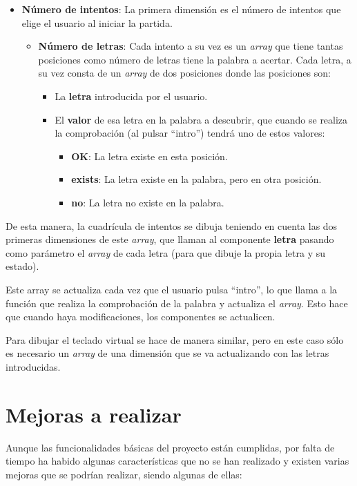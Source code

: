 \documentclass{\ClassPath/viu-tfm-template}
\begin{document}
\vspace{-1em}
\begin{itemize}
    \item \textbf{Número de intentos}: La primera dimensión es el número de intentos que elige el usuario al iniciar la partida.
    \begin{itemize}
        \item \textbf{Número de letras}: Cada intento a su vez es un \textit{array} que tiene tantas posiciones como número de letras tiene la palabra a acertar. Cada letra, a su vez consta de un \textit{array} de dos posiciones donde las posiciones son:
        \begin{itemize}
            \item La \textbf{letra} introducida por el usuario.
            \item El \textbf{valor} de esa letra en la palabra a descubrir, que cuando se realiza la comprobación (al pulsar “intro”) tendrá uno de estos valores:
            \begin{itemize}
                \item \textbf{OK}: La letra existe en esta posición.
                \item \textbf{exists}: La letra existe en la palabra, pero en otra posición.
                \item \textbf{no}: La letra no existe en la palabra.
            \end{itemize}
        \end{itemize}
    \end{itemize}
\end{itemize}
\vspace{-1em}

De esta manera, la cuadrícula de intentos se dibuja teniendo en cuenta las dos primeras dimensiones de este \textit{array}, que llaman al componente \textbf{letra} pasando como parámetro el \textit{array} de cada letra (para que dibuje la propia letra y su estado).

Este array se actualiza cada vez que el usuario pulsa “intro”, lo que llama a la función  que realiza la comprobación de la palabra y actualiza el \textit{array}. Esto hace que cuando haya modificaciones, los componentes se actualicen.

Para dibujar el teclado virtual se hace de manera similar, pero en este caso sólo es necesario un \textit{array} de una dimensión que se va actualizando con las letras introducidas.


\chapter{Mejoras a realizar}
Aunque las funcionalidades básicas del proyecto están cumplidas, por falta de tiempo ha habido algunas características que no se han realizado y existen varias mejoras que se podrían realizar, siendo algunas de ellas:
\end{document}
